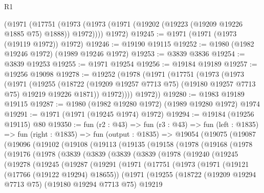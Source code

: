 \begin{lexlean}{R1}
\begin{coremodule}
    (@1971
      (@17751 (@1973 (@1973 (@1971 (@19202 (@19223 (@19209 @19226 @1885 @75) @1888)) @1972))))
      @1972)
@19245 := @1971 (@1971 (@1973 (@19119 @1972)) @1972)
@19246 := @19190 @19115
@19252 := @1980 (@1982 @19246 @1972) (@1989 @19246 @1972)
@19253 := @3839 @3836
@19254 := @3839 @19253
@19255 := @1971 @19254
@19256 := @19184 @19189
@19257 := @19256 @19098
@19278 := @19252
    (@1978
      (@1971
        (@17751
          (@1973
            (@1973
              (@1971
                (@19255
                  (@18722 (@19209 @19257 @7713 @75) (@19180 @19257 @7713 @75) @19219 @19226 @1871))
                @1972))))
        @1972))
@19280 := @1983 @19189 @19115
@19287 := @1980 (@1982 @19280 @1972) (@1989 @19280 @1972) @1974
@19291 := @1971 (@1971 (@19245 @1974) @1972)
@19294 := @19184 (@19256 @19115) @80
@19350 := fun (r2 : @43) =>
  fun (r3 : @43) =>
  fun (left : @1835) =>
  fun (right : @1835) =>
  fun (output : @1835) =>
  @19054
    (@19075
      (@19087
        (@19096
          (@19102
            (@19108
              (@19113
                (@19135
                  (@19158
                    (@1978
                      (@19168
                        (@1978
                          (@19176
                            (@1978
                              (@3839
                                (@3839
                                  (@3839
                                    (@3839
                                      (@1978
                                        (@19240
                                          (@19245
                                            (@19278
                                              (@19245
                                                (@19287
                                                  (@19291
                                                    (@1971
                                                      (@17751
                                                        (@1973
                                                          (@1971
                                                            (@19121 (@17766 (@19122 @19294) @18655))
                                                            (@1971
                                                              (@19255
                                                                (@18722
                                                                  (@19209 @19294 @7713 @75)
                                                                  (@19180 @19294 @7713 @75)
                                                                  @19219

\end{coremodule}
\end{lexlean}
